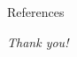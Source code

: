 \begin{frame}[t]{References \hspace{3.25cm} }
  \normalsize
  \begin{multicols}{2}
    \printbibliography
  \end{multicols}
  \vspace{0.25cm}
  \begin{center}
    \Large
    \textit{Thank you!}
  \end{center}
\end{frame}
